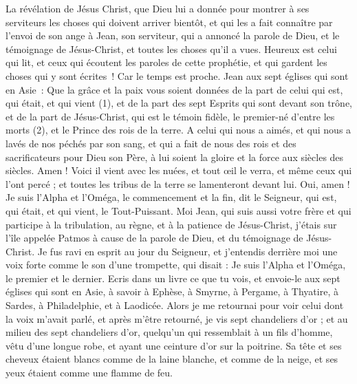 \BFont
\begin{multicols}{2}
\VerseOne{}La révélation de Jésus Christ, que Dieu lui a donnée pour montrer à ses serviteurs les choses qui doivent arriver bientôt, et qui les a fait connaître par l’envoi de son ange à Jean, son serviteur,
qui a annoncé la parole de Dieu, et le témoignage de Jésus-Christ, et toutes les choses qu'il a vues.
Heureux est celui qui lit, et ceux qui écoutent les paroles de cette prophétie, et qui gardent les choses qui y sont écrites ! Car le temps est proche.
Jean aux sept églises qui sont en Asie : Que la grâce et la paix vous soient données de la part de celui qui est, qui était, et qui vient (1), et de la part des sept Esprits qui sont devant son trône,
et de la part de Jésus-Christ, qui est le témoin fidèle, le premier-né d'entre les morts (2), et le Prince des rois de la terre.
A celui qui nous a aimés, et qui nous a lavés de nos péchés par son sang, et qui a fait de nous des rois et des sacrificateurs pour Dieu son Père, à lui soient la gloire et la force aux siècles des siècles. Amen !
Voici il vient avec les nuées, et tout œil le verra, et même ceux qui l'ont percé ; et toutes les tribus de la terre se lamenteront devant lui. Oui, amen !
Je suis l'Alpha et l'Oméga, le commencement et la fin, dit le Seigneur, qui est, qui était, et qui vient, le Tout-Puissant.
Moi Jean, qui suis aussi votre frère et qui participe à la tribulation, au règne, et à la patience de Jésus-Christ, j'étais sur l'île appelée Patmos à cause de la parole de Dieu, et du témoignage de Jésus-Christ.
Je fus ravi en esprit au jour du Seigneur, et j'entendis derrière moi une voix forte comme le son d'une trompette,
qui disait : Je suis l'Alpha et l'Oméga, le premier et le dernier. Ecris dans un livre ce que tu vois, et envoie-le aux sept églises qui sont en Asie, à savoir à Ephèse, à Smyrne, à Pergame, à Thyatire, à Sardes, à Philadelphie, et à Laodicée.
Alors je me retournai pour voir celui dont la voix m'avait parlé, et après m’être retourné, je vis sept chandeliers d'or ;
et au milieu des sept chandeliers d'or, quelqu’un qui ressemblait à un fils d’homme, vêtu d'une longue robe, et ayant une ceinture d'or sur la poitrine.
Sa tête et ses cheveux étaient blancs comme de la laine blanche, et comme de la neige, et ses yeux étaient comme une flamme de feu.

\end{multicols}
